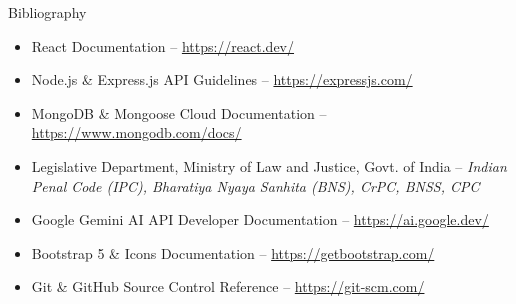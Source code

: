 \documentclass[10pt,aspectratio=169]{beamer}
\begin{document}
\begin{frame}{Bibliography}
  \begin{itemize}
    \setlength{\itemsep}{6pt}
    \item React Documentation -- \url{https://react.dev/}
    \item Node.js \& Express.js API Guidelines -- \url{https://expressjs.com/}
    \item MongoDB \& Mongoose Cloud Documentation -- \url{https://www.mongodb.com/docs/}
    \item Legislative Department, Ministry of Law and Justice, Govt. of India -- \textit{Indian Penal Code (IPC), Bharatiya Nyaya Sanhita (BNS), CrPC, BNSS, CPC}
    \item Google Gemini AI API Developer Documentation -- \url{https://ai.google.dev/}
    \item Bootstrap 5 \& Icons Documentation -- \url{https://getbootstrap.com/}
    \item Git \& GitHub Source Control Reference -- \url{https://git-scm.com/}
  \end{itemize}
\end{frame}
\end{document}
